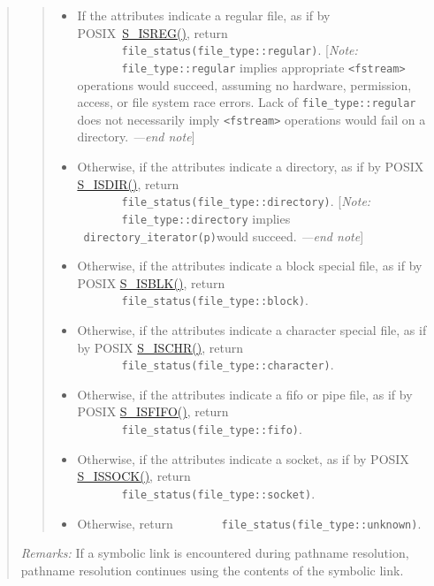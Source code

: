 \begin{quote}
\begin{quote}
\begin{itemize}
\tightlist
\item
  If the attributes indicate a regular file, as if by
  POSIX~\href{http://www.opengroup.org/onlinepubs/000095399/basedefs/sys/stat.h.html}{S\_ISREG()},
  return \texttt{\ \ \ \ \ \ \ file\_status(file\_type::regular)}.
  {[}\emph{Note:} \texttt{\ \ \ \ \ \ \ file\_type::regular} implies
  appropriate \texttt{\textless{}fstream\textgreater{}} operations would
  succeed, assuming no hardware, permission, access, or file system race
  errors. Lack of \texttt{file\_type::regular} does not necessarily
  imply \texttt{\textless{}fstream\textgreater{}} operations would fail
  on a directory. \emph{---end note}{]}
\item
  Otherwise, if the attributes indicate a directory, as if by POSIX
  \href{http://www.opengroup.org/onlinepubs/000095399/basedefs/sys/stat.h.html}{S\_ISDIR()},
  return \texttt{\ \ \ \ \ \ \ file\_status(file\_type::directory)}.
  {[}\emph{Note:} \texttt{\ \ \ \ \ \ \ file\_type::directory} implies
  \texttt{\ directory\_iterator(p)}would succeed. \emph{---end note}{]}
\item
  Otherwise, if the attributes indicate a block special file, as if by
  POSIX
  \href{http://www.opengroup.org/onlinepubs/000095399/basedefs/sys/stat.h.html}{S\_ISBLK()},
  return \texttt{\ \ \ \ \ \ \ file\_status(file\_type::block)}.
\item
  Otherwise, if the attributes indicate a character special file, as if
  by POSIX
  \href{http://www.opengroup.org/onlinepubs/000095399/basedefs/sys/stat.h.html}{S\_ISCHR()},
  return \texttt{\ \ \ \ \ \ \ file\_status(file\_type::character)}.
\item
  Otherwise, if the attributes indicate a fifo or pipe file, as if by
  POSIX
  \href{http://www.opengroup.org/onlinepubs/000095399/basedefs/sys/stat.h.html}{S\_ISFIFO()},
  return \texttt{\ \ \ \ \ \ \ file\_status(file\_type::fifo)}.
\item
  Otherwise, if the attributes indicate a socket, as if by POSIX
  \href{http://www.opengroup.org/onlinepubs/000095399/basedefs/sys/stat.h.html}{S\_ISSOCK()},
  return \texttt{\ \ \ \ \ \ \ file\_status(file\_type::socket)}.
\item
  Otherwise, return
  \texttt{\ \ \ \ \ \ \ file\_status(file\_type::unknown)}.
\end{itemize}
\end{quote}

\emph{Remarks:} If a symbolic link is encountered during pathname
resolution, pathname resolution continues using the contents of the
symbolic link.
\end{quote}

